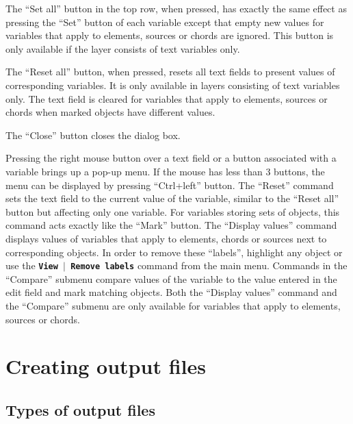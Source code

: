 \documentclass[12pt]{report}
\begin{document}
The ``Set all'' button in the top row, when pressed, has exactly the
same effect as pressing the ``Set'' button of each variable except that
empty new values for variables that apply to elements, sources or
chords are ignored. This button is only available if the layer
consists of text variables only.

The ``Reset all'' button, when pressed, resets all text fields to
present values of corresponding variables. It is only available in
layers consisting of text variables only. The text field is cleared
for variables that apply to elements, sources or chords when marked
objects have different values.


The ``Close'' button closes the dialog box.

Pressing the right mouse button over a text field or a button
associated with a variable brings up a pop-up menu. If the mouse has
less than 3 buttons, the menu can be displayed by pressing ``Ctrl+left''
button.
The ``Reset'' command sets the text field to the current value of the
variable, similar to the ``Reset all'' button but affecting only one
variable. For variables storing sets of objects, this command acts
exactly like the ``Mark'' button.
The ``Display values'' command displays values of variables that apply
to elements, chords or sources next to corresponding objects. In order
to remove these ``labels'', highlight any object or use the 
\textbf{\texttt{View $\mid$ Remove labels}} command from the main menu.
Commands in the ``Compare'' submenu compare values of the variable to
the value entered in the edit field and mark matching objects.
Both the ``Display values'' command and the ``Compare'' submenu are only
available for variables that apply to elements, sources or chords.


\chapter{Creating output files}

\section{Types of output files}
\end{document}
